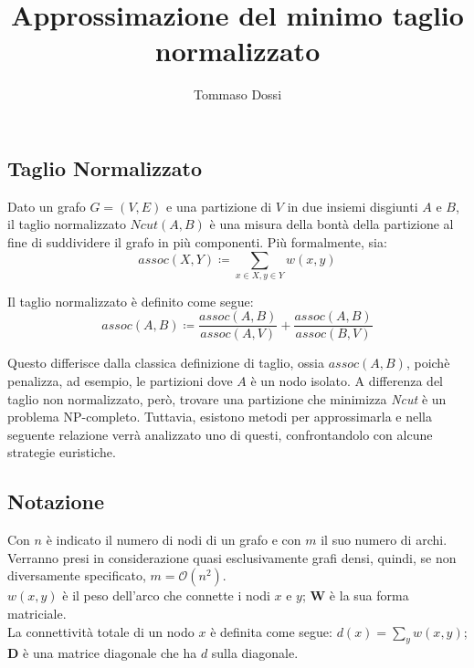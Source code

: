 \documentclass{article}
\title{Approssimazione del minimo taglio normalizzato}
\author{Tommaso Dossi}
\newcommand{\W}{\mathbf{W}}
\newcommand{\D}{\mathbf{D}}
\begin{document}
\maketitle
\begin{multicols}{2}


\section{Taglio Normalizzato}

Dato un grafo $G = (V,E)$ e una partizione di $V$ in due insiemi disgiunti $A$ e $B$,
il taglio normalizzato $Ncut(A,B)$ \`e una misura della bont\`a della partizione
al fine di suddividere il grafo in pi\`u componenti.
Pi\`u formalmente, sia:
\begin{equation*}
    assoc(X,Y) \coloneq \sum_{x \in X, y \in Y} w(x,y)
\end{equation*}

Il taglio normalizzato \`e definito come segue:
\begin{equation}
    assoc(A,B) \coloneq \frac{assoc(A,B)}{assoc(A,V)} + \frac{assoc(A,B)}{assoc(B,V)}
\end{equation}

Questo differisce dalla classica definizione di taglio, ossia $assoc(A,B)$, poich\`e penalizza, ad esempio,
le partizioni dove $A$ \`e un nodo isolato.
A differenza del taglio non normalizzato, per\`o, trovare una partizione che minimizza \textit{Ncut} \`e un problema NP-completo.
Tuttavia, esistono metodi per approssimarla e nella seguente relazione verr\`a analizzato uno di questi, confrontandolo con alcune strategie euristiche.

\subsection{Notazione}
Con $n$ \`e indicato il numero di nodi di un grafo e con $m$ il suo numero di archi.\\
Verranno presi in considerazione quasi esclusivamente grafi densi, quindi, se non diversamente specificato, $m = \mathcal{O}(n^2)$.\\
$w(x,y)$ \`e il peso dell'arco che connette i nodi $x$ e $y$; $\W$ \`e la sua forma matriciale.\\
La connettivit\`a totale di un nodo $x$ \`e definita come segue: $d(x) = \sum_y w(x,y)$;
$\D$ \`e una matrice diagonale che ha $d$ sulla diagonale.


\end{multicols}
\end{document}
